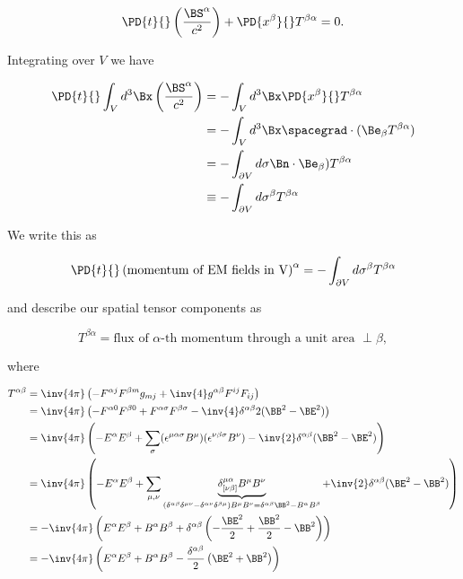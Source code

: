 \begin{equation}\label{eqn:relativisticElectrodynamicsL23:n}
\PD{t}{} \left( \frac{\BS^{\alpha}}{c^2} \right) + \PD{x^\beta}{} T^{\beta \alpha} = 0.
\end{equation}

Integrating over $V$ we have

\begin{align*}
\PD{t}{} \int_V d^3\Bx \left( \frac{\BS^{\alpha}}{c^2} \right) 
&= -\int_V d^3\Bx \PD{x^\beta}{} T^{\beta \alpha} \\
&= -\int_V d^3\Bx \spacegrad \cdot (\Be_\beta T^{\beta \alpha}) \\
&= -\int_{\partial V} d \sigma \Bn \cdot \Be_\beta) T^{\beta \alpha} \\
&\equiv -\int_{\partial V} d \sigma^\beta T^{\beta \alpha} \\
\end{align*}

We write this as

\begin{equation}\label{eqn:relativisticElectrodynamicsL23:n}
\PD{t}{} \left( \text{momentum of EM fields in V} \right)^\alpha = - \int_{\partial V} d\sigma^\beta T^{\beta \alpha}
\end{equation}

and describe our spatial tensor components as

\begin{equation}\label{eqn:relativisticElectrodynamicsL23:n}
T^{\beta\alpha} = \text{flux of $\alpha$-th momentum through a unit area $\perp \beta$},
\end{equation}

where

\begin{align*}
T^{\alpha\beta} 
&= \inv{4\pi} \left( -F^{\alpha j} F^{\beta m} g_{m j} + \inv{4} g^{\alpha\beta} F^{ij}F_{ij} \right) \\
&= \inv{4\pi} \left( 
-F^{\alpha 0} F^{\beta 0} 
+F^{\alpha \sigma} F^{\beta \sigma} 
- \inv{4} \delta^{\alpha\beta} 2 (\BB^2 - \BE^2) \right) \\
&= \inv{4\pi} \left( 
-E^\alpha E^\beta
+\sum_\sigma 
(\epsilon^{\mu\alpha\sigma} B^\mu)
(\epsilon^{\nu\beta\sigma} B^\nu)
- \inv{2} \delta^{\alpha\beta} (\BB^2 - \BE^2) \right) \\
&= \inv{4\pi} \left( 
-E^\alpha E^\beta
+\sum_{\mu,\nu} \underbrace{\delta^{\mu\alpha}_{[\nu\beta]}
B^\mu B^\nu
}_{
(\delta^{\alpha \beta} \delta^{\mu \nu} - \delta^{\alpha \nu} \delta^{\beta \mu} ) 
B^\mu B^\nu
=
\delta^{\alpha\beta}\BB^2 - B^\alpha B^\beta
} 
+ \inv{2} \delta^{\alpha\beta} (\BE^2 - \BB^2) \right) \\
&=
- \inv{4\pi} \left(
E^\alpha E^\beta
+B^\alpha B^\beta
+ \delta^{\alpha\beta} 
\left(
-\frac{\BE^2}{2} + \frac{\BB^2}{2} - \BB^2 \right)
\right) \\
&=
- \inv{4\pi} \left(
E^\alpha E^\beta
+B^\alpha B^\beta
- \frac{\delta^{\alpha\beta} }{2}
\left(
\BE^2 + \BB^2 
\right)
\right) \\
\end{align*}

